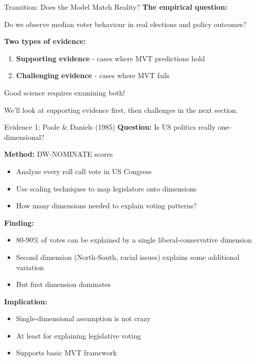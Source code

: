 \documentclass[10pt]{beamer}
\begin{document}
\begin{frame}{Transition: Does the Model Match Reality?}
\textbf{The empirical question:}


\begin{center}
\Large Do we observe median voter behaviour in real elections and policy outcomes?
\end{center}




\textbf{Two types of evidence:}
\begin{enumerate}
\item \textbf{Supporting evidence} - cases where MVT predictions hold
\item \textbf{Challenging evidence} - cases where MVT fails
\end{enumerate}




\alert{Good science requires examining both!}


We'll look at supporting evidence first, then challenges in the next section.
\end{frame}

\begin{frame}[allowframebreaks]{Evidence 1: Poole \& Daniels (1985)}
\textbf{Question:} Is US politics really one-dimensional?



\textbf{Method:} DW-NOMINATE scores
\begin{itemize}
\item Analyze every roll call vote in US Congress
\item Use scaling techniques to map legislators onto dimensions
\item How many dimensions needed to explain voting patterns?
\end{itemize}



\textbf{Finding:}
\begin{itemize}
\item \alert{80-90\% of votes} can be explained by a single liberal-conservative dimension
\item Second dimension (North-South, racial issues) explains some additional variation
\item But first dimension dominates
\end{itemize}


\framebreak
\textbf{Implication:}
\begin{itemize}
\item Single-dimensional assumption is \alert{not crazy}
\item At least for explaining legislative voting
\item Supports basic MVT framework
\end{itemize}
\end{frame}
\end{document}
